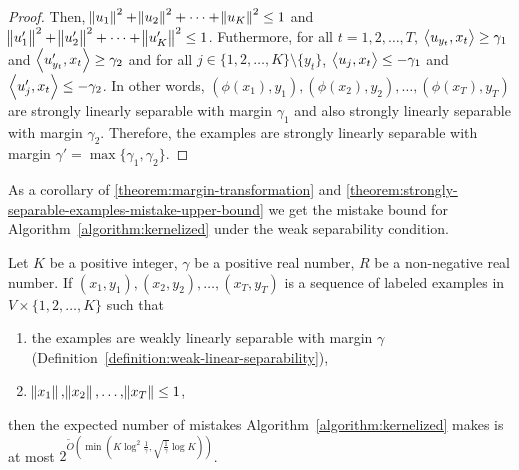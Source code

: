 \begin{proof}
Then, $\norm{u_1}^2 + \norm{u_2}^2 + \dots + \norm{u_K}^2 \le 1$ and
$\norm{u_1'}^2 + \norm{u_2'}^2 + \dots + \norm{u_K'}^2 \le 1$.
Futhermore, for all $t=1,2,\dots,T$, $\left\langle u_{y_t}, x_t \right\rangle \ge \gamma_1$ and
$\left\langle u'_{y_t}, x_t \right\rangle \ge \gamma_2$
and for all $j \in \{1,2,\dots,K\} \setminus \{y_t\}$,
$\left\langle u_j, x_t \right\rangle \le - \gamma_1$ and $\left\langle u'_j, x_t \right\rangle \le - \gamma_2$. In other words,
$(\phi(x_1), y_1), (\phi(x_2), y_2), \dots, (\phi(x_T), y_T)$ are
strongly linearly separable with margin $\gamma_1$ and also strongly linearly
separable with margin $\gamma_2$. Therefore, the examples are strongly
linearly separable with margin $\gamma' = \max\{\gamma_1, \gamma_2\}$.
\end{proof}

As a corollary of \autoref{theorem:margin-transformation} and
\autoref{theorem:strongly-separable-examples-mistake-upper-bound}
we get the mistake bound for Algorithm~\ref{algorithm:kernelized}
under the weak separability condition.

\begin{corollary}
\label{corollary:weakly-separable-examples-mistake-upper-bound}
Let $K$ be a positive
integer, $\gamma$ be a positive real number, $R$ be a non-negative real number. If
$(x_1, y_1), (x_2, y_2), \dots, (x_T, y_T)$ is a sequence of labeled examples in
$V \times \{1,2,\dots,K\}$ such that
\begin{enumerate}
  \item the examples are weakly linearly separable with margin $\gamma$ (Definition~\ref{definition:weak-linear-separability}),
  \item $\norm{x_1}, \norm{x_2}, \dots, \norm{x_T} \le 1$,
\end{enumerate}
then the expected number of mistakes
Algorithm~\ref{algorithm:kernelized}
makes is at most $2^{\widetilde{O}(\min(K \log^2
\frac{1}{\gamma}, \sqrt{\frac{1}{\gamma}} \log K))}$.
\end{corollary}
